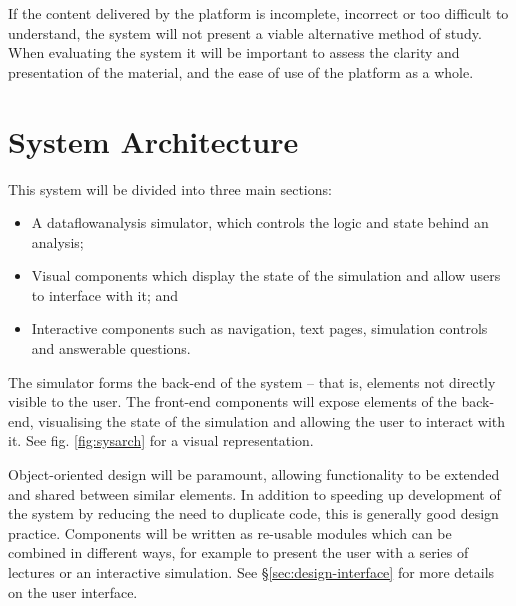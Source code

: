 \documentclass[bsc,twoside,singlespacing,parskip,logo,notimes,normalheadings]{infthesis}
\begin{document}
        If the content delivered by the platform is incomplete,
        incorrect or too difficult to understand, the system will not
        present a viable alternative method of study. When evaluating
        the system it will be important to assess the clarity and
        presentation of the material, and the ease of use of the
        platform as a whole.


    \section{System Architecture}
    This system will be divided into three main sections:

    \begin{itemize}
    \item A \gls{dataflowanalysis} simulator, which controls the logic
      and state behind an analysis;
    \item Visual components which display the state of the
      simulation and allow users to interface with it; and
    \item Interactive components such as navigation, text pages,
      simulation controls and answerable questions.
    \end{itemize}

    The simulator forms the back-end of the system -- that is,
    elements not directly visible to the user. The front-end
    components will expose elements of the back-end, visualising the
    state of the simulation and allowing the user to interact with
    it. See fig. \ref{fig:sysarch} for a visual representation.
    
    Object-oriented design will be paramount, allowing functionality
    to be extended and shared between similar elements. In addition to
    speeding up development of the system by reducing the need to
    duplicate code, this is generally good design practice. Components
    will be written as re-usable modules which can be combined in
    different ways, for example to present the user with a series of
    lectures or an interactive simulation. See
    \S\ref{sec:design-interface} for more details on the user
    interface.
   
\end{document}
